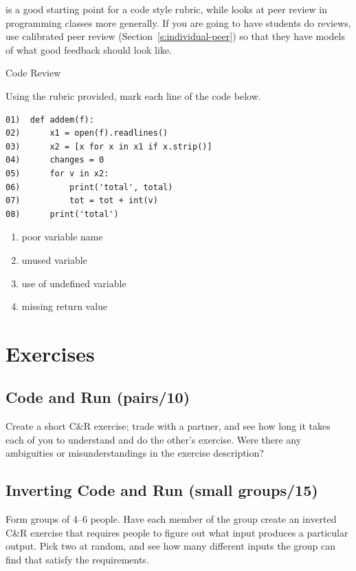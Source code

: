 \cite{Steg2016b} is a good starting point for a code style rubric,
while \cite{Luxt2009} looks at peer review in programming classes
more generally. If you are going to have students do reviews, use
calibrated peer review (Section~\ref{s:individual-peer}) so that they
have models of what good feedback should look like.

\begin{aside}{Code Review}

Using the rubric provided, mark each line of the code below.

\begin{verbatim}
01)  def addem(f):
02)      x1 = open(f).readlines()
03)      x2 = [x for x in x1 if x.strip()]
04)      changes = 0
05)      for v in x2:
06)          print('total', total)
07)          tot = tot + int(v)
08)      print('total')
\end{verbatim}

\begin{enumerate}
\item
  poor variable name
\item
  unused variable
\item
  use of undefined variable
\item
  missing return value
\end{enumerate}

\end{aside}

\section{Exercises}\label{s:exercises-exercises}

\subsection*{Code and Run (pairs/10)}

Create a short C\&R exercise; trade with a partner, and see how long it
takes each of you to understand and do the other's exercise. Were there
any ambiguities or misunderstandings in the exercise description?

\subsection*{Inverting Code and Run (small groups/15)}

Form groups of 4--6 people. Have each member of the group create an
inverted C\&R exercise that requires people to figure out what input
produces a particular output. Pick two at random, and see how many
different inputs the group can find that satisfy the requirements.

